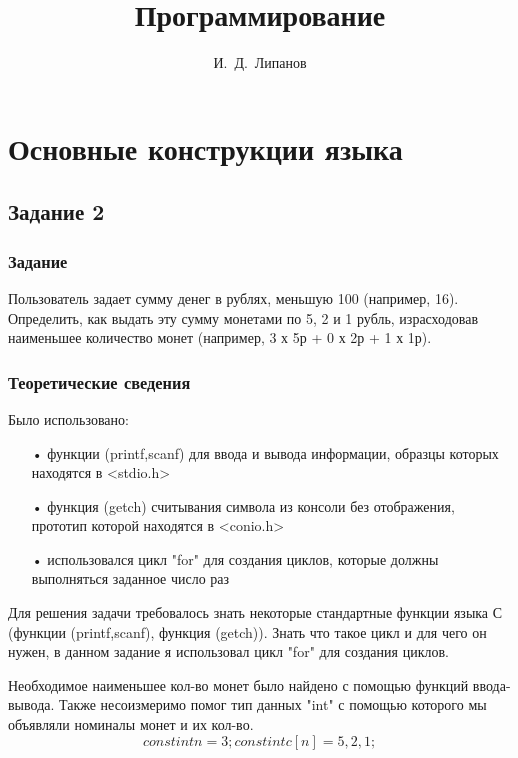 \documentclass[12pt,a4paper]{report}
\author{И.~Д.~Липанов}
\title{Программирование}
\begin{document}
\maketitle
\tableofcontents{}
\chapter{Основные конструкции языка}
\section{Задание 2}
\subsection{Задание}
Пользователь задает сумму денег в рублях, меньшую 100 (например, 16). Определить, как выдать эту сумму монетами по 5, 2 и 1 рубль, израсходовав наименьшее количество монет (например, 3 х 5р + 0 х 2р + 1 х 1р).

\subsection{Теоретические сведения}

Было использовано:
\begin{enumerate}
\item[•] функции (printf,scanf) для ввода и вывода информации, образцы которых находятся в <stdio.h>
\item[•] функция (getch) считывания символа из консоли без отображения, прототип которой находятся в <conio.h>
\item[•] использовался цикл "for" для создания циклов, которые должны выполняться заданное число раз
\end{enumerate}

Для решения задачи требовалось знать некоторые стандартные функции языка С (функции (printf,scanf), функция (getch)). Знать что такое цикл и для чего он нужен, в данном задание я использовал цикл "for" для создания циклов.

Необходимое наименьшее кол-во монет было найдено с помощью функций ввода-вывода. Также несоизмеримо помог тип данных "int" с помощью которого мы объявляли номиналы монет и их кол-во.
\begin{equation}
const int n=3;
const int c[n]={5,2,1};
\end{equation}
\end{document}
